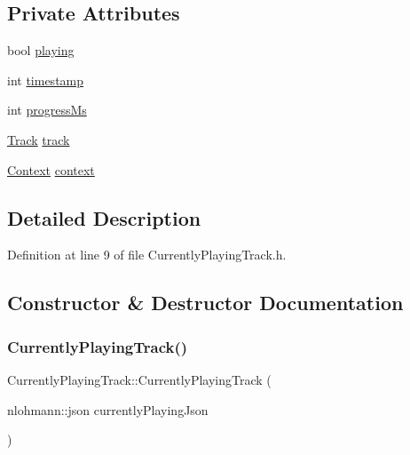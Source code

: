\subsection*{Private Attributes}
\begin{DoxyCompactItemize}
\item 
bool \mbox{\hyperlink{class_currently_playing_track_aa8b1c3a75ea8881bce6775e34753e88e}{playing}}
\item 
int \mbox{\hyperlink{class_currently_playing_track_abce2cba8d839173f2adc79c3a167b615}{timestamp}}
\item 
int \mbox{\hyperlink{class_currently_playing_track_a271412b0faeacf1e16408175d5fba690}{progress\+Ms}}
\item 
\mbox{\hyperlink{class_track}{Track}} \mbox{\hyperlink{class_currently_playing_track_a2c83d87f79c36cff4591718fff02e5bb}{track}}
\item 
\mbox{\hyperlink{class_context}{Context}} \mbox{\hyperlink{class_currently_playing_track_accf9a865b5c637b5a5bf3eb39beab142}{context}}
\end{DoxyCompactItemize}


\subsection{Detailed Description}


Definition at line 9 of file Currently\+Playing\+Track.\+h.



\subsection{Constructor \& Destructor Documentation}
\mbox{\label{class_currently_playing_track_a6855d511ae03b384fe6683faf2280e67}} 
\subsubsection{\texorpdfstring{Currently\+Playing\+Track()}{CurrentlyPlayingTrack()}}
{\footnotesize\ttfamily Currently\+Playing\+Track\+::\+Currently\+Playing\+Track (\begin{DoxyParamCaption}\item[{nlohmann\+::json}]{currently\+Playing\+Json }\end{DoxyParamCaption})}



